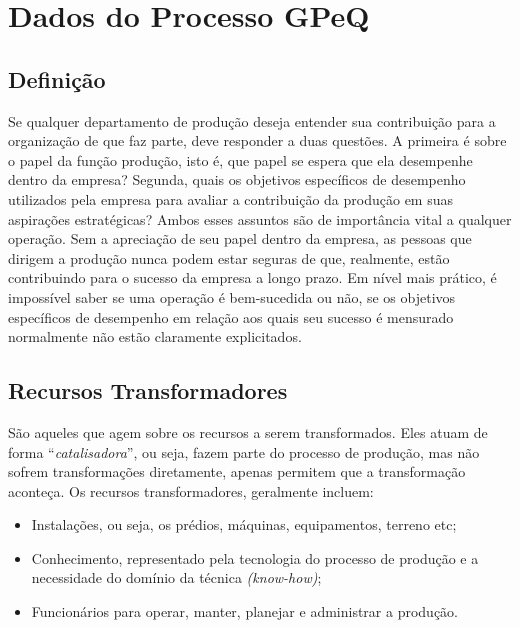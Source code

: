 \chapter[Dados do Processo GPeQ]{Dados do Processo GPeQ}
\label{chap:dados}
	
	\section[Definição]{Definição}
	\label{sec:dados_definicao}

	Se qualquer departamento de produção deseja entender sua contribuição para a organização de que faz parte, deve responder a duas questões. A primeira é sobre o papel da função produção, isto é, que papel se espera que ela desempenhe dentro da empresa? Segunda, quais os objetivos específicos de desempenho utilizados pela empresa para avaliar a contribuição da produção em suas aspirações estratégicas? Ambos esses assuntos são de importância vital a qualquer operação. Sem a apreciação de seu papel dentro da empresa, as pessoas que dirigem a produção nunca podem estar seguras de que, realmente, estão contribuindo para o sucesso da empresa a longo prazo. Em nível mais prático, é impossível saber se uma operação é bem-sucedida ou não, se os objetivos específicos de desempenho em relação aos quais seu sucesso é mensurado normalmente não estão claramente explicitados. \cite{slack}

	\section[Recursos Transformadores]{Recursos Transformadores}
	\label{sec:dados_transformadores}

		São aqueles que agem sobre os recursos a serem transformados. Eles atuam de forma “\emph{catalisadora}”, ou seja, fazem parte do processo de produção, mas não sofrem transformações diretamente, apenas permitem que a transformação aconteça. Os recursos transformadores, geralmente incluem: 

		\begin{itemize}
			\item{Instalações, ou seja, os prédios, máquinas, equipamentos, terreno etc;}
			\item{Conhecimento, representado pela tecnologia do processo de produção e a necessidade do domínio da técnica \emph{(know-how)};}
			\item{Funcionários para operar, manter, planejar e administrar a produção.}
		\end{itemize}

